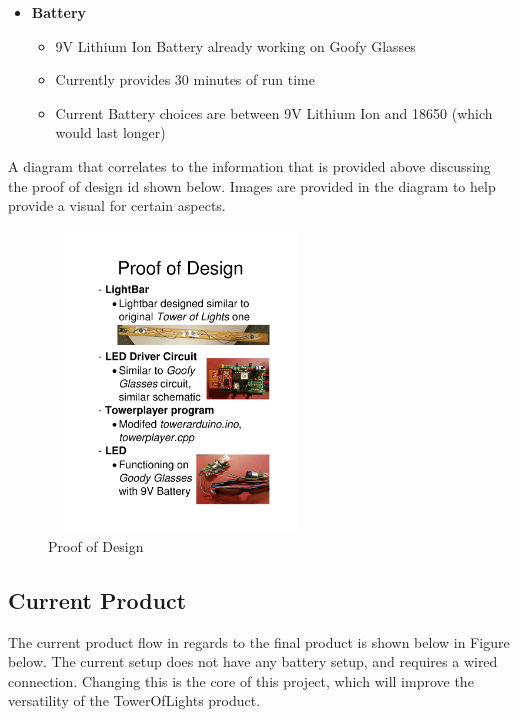 \documentclass[12pt]{article}
\begin{document}
{{{{\begin{itemize}
\begin{itemize}
					\item Similar design, with battery and circuit providing the power and data to correctly display specific color for LED
					\item Layout of LEDs will actually follow similar design as the original "Tower of Lights" LightBar.
				\end{itemize}
				\item \textbf{Battery}
				\begin{itemize}
					\item 9V Lithium Ion Battery already working on Goofy Glasses
					\item Currently provides 30 minutes of run time
					\item Current Battery choices are between 9V Lithium Ion and 18650 (which would last longer)
				\end{itemize}
			\end{itemize}
			
			A diagram that correlates to the information that is provided above discussing the proof of design id shown below. Images are provided in the diagram to help provide a visual for certain aspects.
			
			\begin{figure}[!htb]
				\centering
				\includegraphics[width = 70mm, height = 80mm]{assets/Proof_Of_Design.png}
				\caption{Proof of Design \label{overflow}}
			\end{figure}
			
				
		\subsection{Current Product}
			The current product flow in regards to the final product is shown below in Figure below. The current setup does not have any battery setup, and requires a wired connection. Changing this is the core of this project, which will improve the versatility of the TowerOfLights product.
			
}}}}
\end{document}
